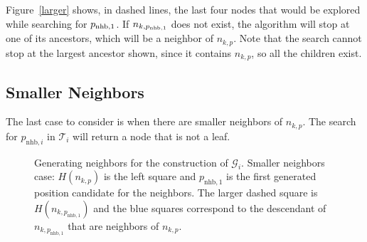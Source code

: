 \documentclass[letterpaper, 10 pt, conference]{ieeeconf}
\theoremstyle{definition}
\begin{document}
Figure~\ref{larger} shows, in dashed lines, the last four nodes that would be explored while searching for $p_{\rm{nhb},1}$. If $n_{k,p_{\rm{nhb},1}}$ does not exist, the algorithm will stop at one of its ancestors, which will be a neighbor of $n_{k,p}$. Note that the search cannot stop at the largest ancestor shown, since it contains $n_{k,p}$, so all the children exist.

\subsection{Smaller Neighbors}

The last case to consider is when there are smaller neighbors of $n_{k,p}$. The search for $p_{\mathrm{nhb},i}$ in $\mathcal{T}_i$ will return a node that is not a leaf.
\begin{figure}[ht]
\centering
	
\newcommand{\drawChildren}[2]{\draw[treenodes] #1 rectangle ($#1+(#2,#2)$);
\draw[treenodes] #1 rectangle ($#1+(-#2,#2)$);
\draw[treenodes] #1 rectangle ($#1+(-#2,-#2)$);
\draw[treenodes] #1 rectangle ($#1+(#2,-#2)$);}

 	\caption{Generating neighbors for the construction of $\mathcal{G}_i$.  Smaller neighbors case: $H(n_{k,p})$ is the left square and $p_{\mathrm{nhb},1}$ is the first generated position candidate for the neighbors. The larger dashed square is $H(n_{k,p_{\mathrm{nhb},1}})$ and the blue squares correspond to the descendant of $n_{k,p_{\mathrm{nhb},1}}$ that are neighbors of $n_{k,p}$.}
	\label{smaller}
\end{figure}
\end{document}
